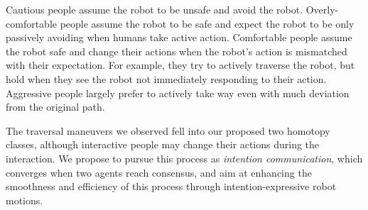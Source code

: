\documentclass[conference]{IEEEtran}
\begin{document}
Cautious people assume the robot to be unsafe and avoid the robot. Overly-comfortable 
people assume the robot to be safe and expect the robot to be only passively avoiding when 
humans take active action. Comfortable people assume the robot safe and change 
their actions when the robot's action is mismatched with their expectation. 
For example, they try to actively traverse the robot, but hold when they see 
the robot not immediately responding to their action. Aggressive people 
largely prefer to actively take way even with much deviation from the original path. 

The traversal maneuvers we observed fell into our proposed two homotopy 
classes, although interactive people may change their actions during the 
interaction. We propose to pursue this process as \textit{intention communication}, 
which converges when two agents reach consensus, and aim at enhancing the 
smoothness and efficiency of this process through intention-expressive robot 
motions.

\vspace{-.3em}
\end{document}
